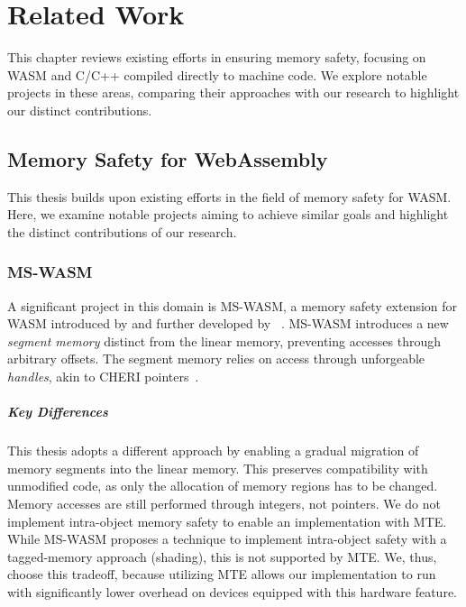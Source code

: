 \chapter{Related Work}
\label{ch:related}

This chapter reviews existing efforts in ensuring memory safety, focusing on \ac{WASM} and C/C++ compiled directly to machine code.
We explore notable projects in these areas, comparing their approaches with our research to highlight our distinct contributions.


\section{Memory Safety for WebAssembly}
\label{sec:related-memory-safety-for-webassembly}

This thesis builds upon existing efforts in the field of memory safety for \ac{WASM}.
Here, we examine notable projects aiming to achieve similar goals and highlight the distinct contributions of our research.

\subsection{MS-WASM}
\label{subsec:ms-wasm}

A significant project in this domain is MS-WASM, a memory safety extension for WASM introduced by \citeauthor*{disselkoen2019position} and further developed by \citeauthor*{michael2023mswasm}~\cite{disselkoen2019position,michael2023mswasm}.
MS-WASM introduces a new \textit{segment memory} distinct from the linear memory, preventing accesses through arbitrary offsets.
The segment memory relies on access through unforgeable \textit{handles}, akin to CHERI pointers~\cite{woodruff2014cheri}.

\paragraph{Key Differences}
This thesis adopts a different approach by enabling a gradual migration of memory segments into the linear memory.
This preserves compatibility with unmodified code, as only the allocation of memory regions has to be changed.
Memory accesses are still performed through integers, not pointers.
We do not implement intra-object memory safety to enable an implementation with \ac{MTE}.
While MS-WASM proposes a technique to implement intra-object safety with a tagged-memory approach (shading), this is not supported by \ac{MTE}.
We, thus, choose this tradeoff, because utilizing \ac{MTE} allows our implementation to run with significantly lower overhead on devices equipped with this hardware feature.

